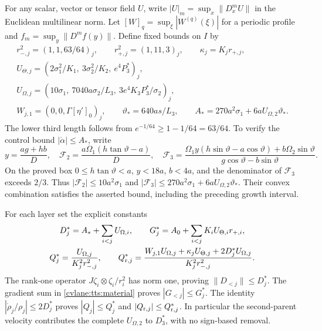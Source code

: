 For any scalar, vector or tensor field $U$, write
$|U|_m=\sup_x\|D_x^mU\|$ in the Euclidean multilinear norm.
Let $[W]_q=\sup_\xi|W^{(q)}(\xi)|$ for a periodic profile and
$f_m=\sup_y\|D^mf(y)\|$. Define fixed bounds on $I$ by
\begin{equation}\label{cvlane:tts:normdata}
 \begin{gathered}
 r_{-,j}^2=(1,1,63/64)_j,\qquad
 r_{+,j}^2=(1,11,3)_j,\qquad \kappa_j=K_jr_{+,j},\\
 U_{\Theta,j}=(2\sigma_1^2/K_1,\ 3\sigma_2^2/K_2,
                                      \ e^4P_3^*)_j,\\
 U_{\Omega,j}=(10\sigma_1,\ 7040a\sigma_2/L_3,
                             \ 3e^4K_3P_3^*/\sigma_2)_j,\\
 W_{j,1}=(0,0,\Gamma[\eta']_0)_j,\qquad
 \vartheta_*=640as/L_3,\qquad
 A_*=270a^2\sigma_1+6aU_{\Omega,2}\vartheta_*.
 \end{gathered}
\end{equation}
The lower third length follows from
$e^{-1/64}\geq1-1/64=63/64$. To verify the control bound
$|\dot\alpha|\leq A_*$, write
\[
 y=\frac{ag+hb}{D},\quad
 \mathcal F_2=\frac{a\Omega_1(h\tan\vartheta-a)}D,\quad
 \mathcal F_3=
 \frac{\Omega_1y(h\sin\vartheta-a\cos\vartheta)
                  +b\Omega_2\sin\vartheta}
      {g\cos\vartheta-b\sin\vartheta}.
\]
On the proved box $0\leq h\tan\vartheta<a$, $y<18a$,
$b<4a$, and the denominator of $\mathcal F_3$ exceeds $2/3$.
Thus $|\mathcal F_2|\leq10a^2\sigma_1$ and
$|\mathcal F_3|\leq270a^2\sigma_1+
6aU_{\Omega,2}\vartheta_*$. Their convex combination satisfies
the asserted bound, including the preceding growth interval.

For each layer set the explicit constants
\begin{equation}\label{cvlane:tts:parentbounds}
 \begin{gathered}
 D_j^*=A_*+\sum_{i<j}U_{\Omega,i},\qquad
 G_j^*=A_0+\sum_{i<j}K_iU_{\Theta,i}r_{+,i},\\
 Q_j^*=\frac{U_{\Omega,j}}{K_j^2r_{-,j}^2},\qquad
 Q_{{\rm r},j}^*=
 \frac{W_{j,1}U_{\Omega,j}+\kappa_jU_{\Theta,j}
                              +2D_j^*U_{\Omega,j}}
      {K_j^2r_{-,j}^2}.
 \end{gathered}
\end{equation}
The rank-one operator
$J\zeta_i\otimes\zeta_i/r_i^2$ has norm one, proving
$\|D_{<j}\|\leq D_j^*$. The gradient sum in
\eqref{cvlane:tts:material} proves $|G_{<j}|\leq G_j^*$.
The identity $|\dot\rho_j/\rho_j|\leq2D_j^*$ proves
$|Q_j|\leq Q_j^*$ and $|Q_{{\rm r},j}|\leq Q_{{\rm r},j}^*$.
In particular the second-parent velocity contributes the complete
$U_{\Omega,2}$ to $D_3^*$, with no sign-based removal.

